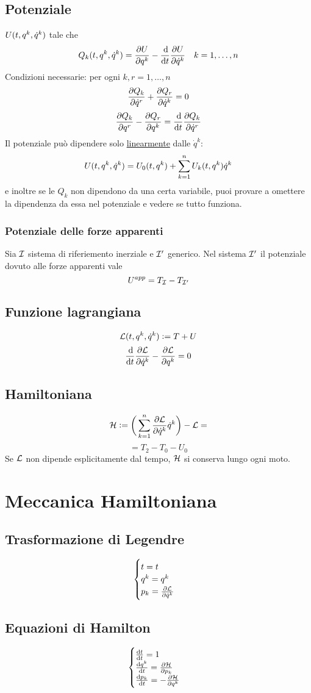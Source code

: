 \documentclass[11pt,landscape]{article}
\begin{document}
\begin{multicols}{3}
    \subsection{Potenziale}
        $U (t, q^k, \dot q ^k)$ tale che $$ Q_k \diptre = \de{U}{q^k} - \ddt\de{U}{\dot q ^k} \quad k = 1,\dots,n$$
        Condizioni necessarie: per ogni $k,r = 1,\dots, n$
        $$ \frac{\partial Q_k}{\partial \dot q^r} + \frac{\partial Q_r}{\partial \dot q^k} = 0$$
        $$\de{Q_k}{q^r} - \de{Q_r}{q^k} = \ddt \de{Q_k}{\dot q^r}$$
        Il potenziale può dipendere solo \underline{linearmente} dalle $\dot q ^k$:
        $$ U (t, q^k, \dot q ^k) = U_0 (t, q^k) + \sum_{k=1}^n U_k (t, q^k) \dot q^k$$
        e inoltre se le $Q_k$ non dipendono da una certa variabile, puoi provare a omettere la dipendenza da essa nel potenziale e vedere se tutto funziona.
        \subsubsection{Potenziale delle forze apparenti}
        Sia $\mathcal{I}$ sistema di riferiemento inerziale e $\mathcal{I}'$ generico. Nel sistema $\mathcal{I}'$ il potenziale dovuto alle forze apparenti vale
        $$ U^{app} = T_{\mathcal{I}} - T_{\mathcal{I}'}$$
    \subsection{Funzione lagrangiana}
        $$ \mathcal{L} (t, q^k, \dot q ^k) := T + U$$
        $$ \ddt \de{\Lag}{\dot q^k} - \de{\Lag}{q^k} = 0$$
    \subsection{Hamiltoniana}
        $$ \mathcal{H} := \bigg(\sum_{k=1}^n \frac{\partial \mathcal{L}}{\partial \dot q^k} \dot q^k \bigg) - \mathcal{L} = $$
        $$ = T_2 - T_0 - U_0$$
        Se $\mathcal{L}$ non dipende esplicitamente dal tempo, $\mathcal{H}$ si conserva lungo ogni moto.
\section{Meccanica Hamiltoniana}
    \subsection{Trasformazione di Legendre}
        $$ \begin{cases}
            t = t\\
            q^k = q^k\\
            p_k = \frac{\partial \mathcal{L}}{\partial \dot q^k}
        \end{cases}$$
    \subsection{Equazioni di Hamilton}
        $$ \begin{cases}
            \frac{\dif t}{\dif t} = 1\\
            \frac{\dif q^k}{\dif t} = \de{\Ham}{p_k}\\
            \frac{\dif p_k}{\dif t} = - \de{\Ham}{q^k}
        \end{cases}$$

\end{multicols}
\end{document}
